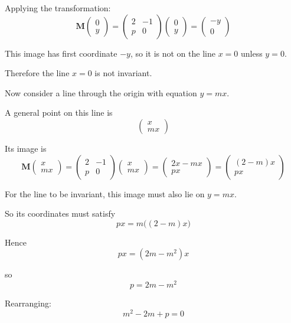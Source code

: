 \documentclass[leqno]{article}
\begin{document}
\begin{enumerate}[
  label=\textbf{\arabic*.},
  leftmargin=*,
  topsep=0pt,
  partopsep=0pt,
  parsep=0pt
]
\begin{djsSolution}
\begin{enumerate}[label=\textbf{(\alph*)}]
  Applying the transformation:
  \[
  \mathbf{M}\begin{pmatrix}0\\y\end{pmatrix}
  =
  \begin{pmatrix}2&-1\\ p&0\end{pmatrix}
  \begin{pmatrix}0\\y\end{pmatrix}
  =
  \begin{pmatrix}-y\\0\end{pmatrix}
  \]

  This image has first coordinate $-y$, so it is not on the line $x=0$ unless $y=0$.

  Therefore the line $x=0$ is not invariant.

  Now consider a line through the origin with equation $y=mx$.

  A general point on this line is
  \[
  \begin{pmatrix}x\\mx\end{pmatrix}
  \]

  Its image is
  \[
  \mathbf{M}\begin{pmatrix}x\\mx\end{pmatrix}
  =
  \begin{pmatrix}2&-1\\ p&0\end{pmatrix}
  \begin{pmatrix}x\\mx\end{pmatrix}
  =
  \begin{pmatrix}2x-mx\\ px\end{pmatrix}
  =
  \begin{pmatrix}(2-m)x\\ px\end{pmatrix}
  \]

  For the line to be invariant, this image must also lie on $y=mx$.

  So its coordinates must satisfy
  \[
  px=m\bigl((2-m)x\bigr)
  \]

  Hence
  \[
  px=(2m-m^2)x
  \]

  so
  \[
  p=2m-m^2
  \]

  Rearranging:
  \[
  m^2-2m+p=0
  \]


\end{enumerate}
\end{djsSolution}
\end{enumerate}
\end{document}
